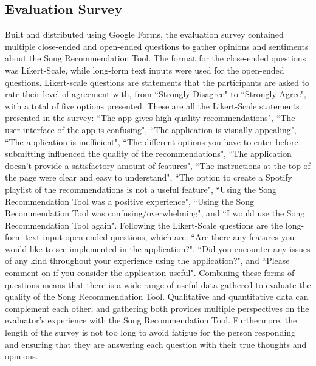 \documentclass{l4proj}
\begin{document}
\subsection{Evaluation Survey}
Built and distributed using Google Forms, the evaluation survey contained multiple close-ended and open-ended questions to gather opinions and sentiments about the Song Recommendation Tool. The format for the close-ended questions was Likert-Scale, while long-form text inputs were used for the open-ended questions. Likert-scale questions are statements that the participants are asked to rate their level of agreement with, from ``Strongly Disagree" to ``Strongly Agree", with a total of five options presented. These are all the Likert-Scale statements presented in the survey: ``The app gives high quality recommendations", ``The user interface of the app is confusing", ``The application is visually appealing", ``The application is inefficient", ``The different options you have to enter before submitting influenced the quality of the recommendations", ``The application doesn't provide a satisfactory amount of features", ``The instructions at the top of the page were clear and easy to understand", ``The option to create a Spotify playlist of the recommendations is not a useful feature", ``Using the Song Recommendation Tool was a positive experience", ``Using the Song Recommendation Tool was confusing/overwhelming", and ``I would use the Song Recommendation Tool again". Following the Likert-Scale questions are the long-form text input open-ended questions, which are: ``Are there any features you would like to see implemented in the application?", ``Did you encounter any issues of any kind throughout your experience using the application?", and ``Please comment on if you consider the application useful". Combining these forms of questions means that there is a wide range of useful data gathered to evaluate the quality of the Song Recommendation Tool. Qualitative and quantitative data can complement each other, and gathering both provides multiple perspectives on the evaluator's experience with the Song Recommendation Tool. Furthermore, the length of the survey is not too long to avoid fatigue for the person responding and ensuring that they are answering each question with their true thoughts and opinions. 
\end{document}
